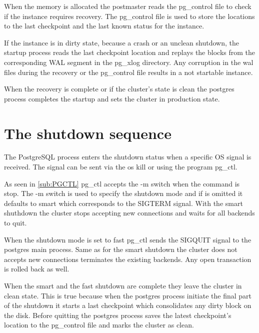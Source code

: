 When the memory is allocated the postmaster reads the pg\_control
file to check if the instance requires recovery. The pg\_control file is used to store the locations
to the last checkpoint and the last known status for the instance.\newline

If  the instance is in dirty state, because a crash or an unclean shutdown, the startup
process reads the last checkpoint location and replays the blocks from the corresponding WAL
segment in the pg\_xlog directory. Any corruption in the wal files during the recovery or the
pg\_control file results in a not startable instance.\newline

When the recovery is complete or if the cluster's state is clean the postgres process completes the
startup and sets the cluster in production state. 


\section{The shutdown sequence} 
\label{sec:SHUTDOWN_SEQ}

The PostgreSQL process enters the shutdown status when a specific OS signal is received. The signal
can be sent via the os kill or using the program pg\_ctl. \newline

As seen in \ref{sub:PGCTL} pg\_ctl accepts the -m switch when the command is stop. The -m switch
is used to specify the shutdown mode and if is omitted it defaults to smart which corresponds to
the SIGTERM signal. With the smart shuthdown the cluster stops accepting new connections and
waits for all backends to quit. \newline

When the shutdown mode is set to fast pg\_ctl sends the SIGQUIT signal to the postgres main process.
Same as for the smart shutdown the cluster does not accepts new connections terminates the existing
backends. Any open transaction is rolled back as well. \newline

When the smart and the fast shutdown are complete they leave the cluster in clean state. This is
true because when the postgres process initiate the final part of the shutdown it starts a
last checkpoint which consolidates any dirty block on the disk. Before quitting the postgres
process saves the latest checkpoint's location to the pg\_control file and marks the
cluster as clean.\newline

